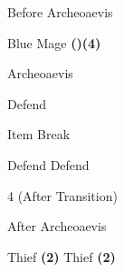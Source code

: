 \begin{paracol}{2}
\switchcolumn
\begin{menu}{Before Archeoaevis}
    \varwb
    \begin{notes}
        \item {}
    \end{notes}
    \begin{jobMenu}
        \bartz Blue Mage \textbf{(\pointDown)(4\pointRight)} \optimize \space \equip{\thunderRod}
    \end{jobMenu}
    \varwe
\end{menu}

\begin{boss}{Archeoaevis}
	\varwb
	\begin{round}{1}
		\lenna \leftCommand{\throw} \then \thunderScroll
        \galuf Defend
        \item {}
        \item {}
        \faris \leftCommand{\gaia}
        \bartz Item \then \battleGroup{\thunderRod} \then Break
	\end{round}
    \begin{round}{2}
        \lenna \leftCommand{\throw} \then \thunderScroll
        \galuf Defend
        \faris \leftCommand{\gaia}
        \lenna \leftCommand{\throw} \then \thunderScroll
        \bartz Defend
    \end{round}
    \begin{round}{3}
        \galuf \leftCommand{\throw} \then \thunderScroll
        \faris \leftCommand{\gaia}
        \lenna \leftCommand{\throw} \then \shuriken
        \galuf \leftCommand{\throw} \then \ancientSword
    \end{round}
    \begin{round}{4 (After Transition)}
        \bartz \leftCommand{\blue} \then \lfiveDeath
    \end{round}
	\varwe
\end{boss}

\begin{menu}{After Archeoaevis}
    \varwb
    \begin{jobMenu}
        \lenna Thief \textbf{(2\pointRight)} \ability{!\tame}
        \galuf Thief \textbf{(2\pointRight)}
    \end{jobMenu}
    \varwe
\end{menu}

\end{paracol}
\newpage